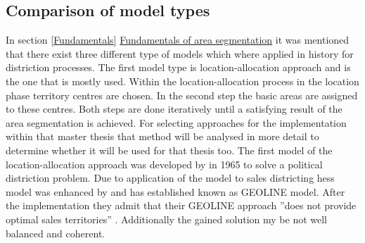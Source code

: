 \subsection{Comparison of model types}
In section \ref{Fundamentals} \hyperref[Fundamentals]{Fundamentals of area segmentation} it was mentioned that there exist three different type of models which where applied in history for distriction processes. The first model type is location-allocation approach and is the one that is mostly used. Within the location-allocation process in the location phase territory centres are chosen. In the second step the basic areas are assigned to these centres. Both steps are done iteratively until a satisfying result of the area segmentation is achieved. For selecting approaches for the implementation within that master thesis that method will be analysed in more detail to determine whether it will be used for that thesis too. The first model of the location-allocation approach was developed by \citeauthor{hess} \cite{hess} in 1965 to solve a political distriction problem. Due to application of the model to sales districting hess model was enhanced by \citeauthor{hessstuart} \cite{hessstuart} and has established known as GEOLINE model. After the implementation they admit that their GEOLINE approach ''does not provide optimal sales territories'' \cite{hessstuart}. Additionally the gained solution my be not well balanced and coherent.
